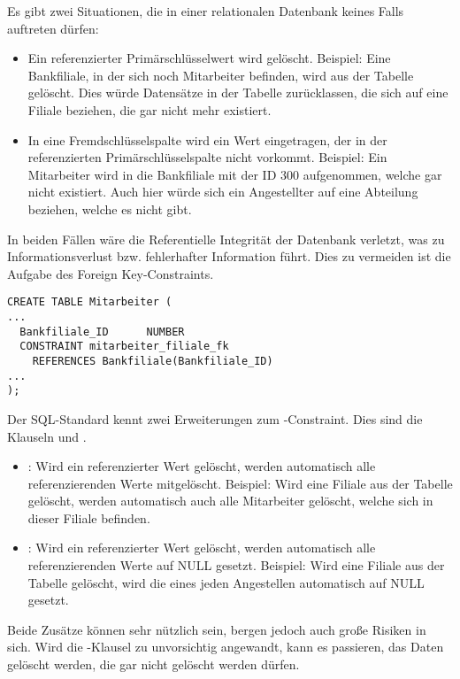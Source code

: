        \begin{merke}
          Es gibt zwei Situationen, die in einer relationalen Datenbank keines Falls auftreten d\"urfen:
          \begin{itemize}
            \item Ein referenzierter Prim\"arschl\"usselwert wird gel\"oscht. Beispiel: Eine Bankfiliale, in der sich noch Mitarbeiter befinden, wird aus der Tabelle  gel\"oscht. Dies w\"urde Datens\"atze in der Tabelle  zur\"ucklassen, die sich auf eine Filiale beziehen, die gar nicht mehr existiert.
            \item In eine Fremdschl\"usselspalte wird ein Wert eingetragen, der in der referenzierten Prim\"arschl\"usselspalte nicht vorkommt. Beispiel: Ein Mitarbeiter wird in die Bankfiliale mit der ID 300 aufgenommen, welche gar nicht existiert. Auch hier w\"urde sich ein Angestellter auf eine Abteilung beziehen, welche es nicht gibt.
        \end{itemize}
        In beiden F\"allen w\"are die Referentielle Integrit\"at der Datenbank verletzt, was zu Informationsverlust bzw. fehlerhafter Information f\"uhrt. Dies zu vermeiden ist die Aufgabe des Foreign Key-Constraints.
        \end{merke}
        \begin{lstlisting}[language=oracle_sql,caption={Ein Foreign Key-Constraint als Inline Constraint anlegen},label=sql09_16]
CREATE TABLE Mitarbeiter (
...
  Bankfiliale_ID      NUMBER
  CONSTRAINT mitarbeiter_filiale_fk
    REFERENCES Bankfiliale(Bankfiliale_ID)
...
);
        \end{lstlisting}
        Der SQL-Standard kennt zwei Erweiterungen zum -Constraint. Dies sind die Klauseln  und .
        \begin{itemize}
          \item {}: Wird ein referenzierter Wert gel\"oscht, werden automatisch alle referenzierenden Werte mitgel\"oscht. Beispiel: Wird eine Filiale aus der Tabelle  gel\"oscht, werden automatisch auch alle Mitarbeiter gel\"oscht, welche sich in dieser Filiale befinden.
          \item {}: Wird ein referenzierter Wert gel\"oscht, werden automatisch alle referenzierenden Werte auf NULL gesetzt. Beispiel: Wird eine Filiale aus der Tabelle  gel\"oscht, wird die  eines jeden Angestellen automatisch auf NULL gesetzt.
        \end{itemize}
        Beide Zus\"atze k\"onnen sehr n\"utzlich sein, bergen jedoch auch gro\ss e Risiken in sich. Wird die -Klausel zu unvorsichtig angewandt, kann es passieren, das Daten gel\"oscht werden, die gar nicht gel\"oscht werden d\"urfen.

